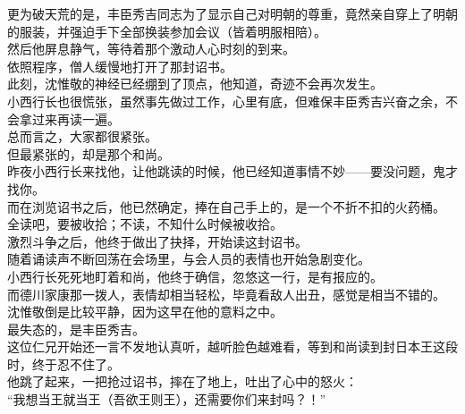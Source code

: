 \begin{multicols}{\theparacolNo}
更为破天荒的是，丰臣秀吉同志为了显示自己对明朝的尊重，竟然亲自穿上了明朝的服装，并强迫手下全部换装参加会议（皆着明服相陪）。\\

然后他屏息静气，等待着那个激动人心时刻的到来。\\

依照程序，僧人缓慢地打开了那封诏书。\\

此刻，沈惟敬的神经已经绷到了顶点，他知道，奇迹不会再次发生。\\

小西行长也很慌张，虽然事先做过工作，心里有底，但难保丰臣秀吉兴奋之余，不会拿过来再读一遍。\\

总而言之，大家都很紧张。\\

但最紧张的，却是那个和尚。\\

昨夜小西行长来找他，让他跳读的时候，他已经知道事情不妙——要没问题，鬼才找你。\\

而在浏览诏书之后，他已然确定，捧在自己手上的，是一个不折不扣的火药桶。\\

全读吧，要被收拾；不读，不知什么时候被收拾。\\

激烈斗争之后，他终于做出了抉择，开始读这封诏书。\\

随着诵读声不断回荡在会场里，与会人员的表情也开始急剧变化。\\

小西行长死死地盯着和尚，他终于确信，忽悠这一行，是有报应的。\\

而德川家康那一拨人，表情却相当轻松，毕竟看敌人出丑，感觉是相当不错的。\\

沈惟敬倒是比较平静，因为这早在他的意料之中。\\

最失态的，是丰臣秀吉。\\

这位仁兄开始还一言不发地认真听，越听脸色越难看，等到和尚读到封日本王这段时，终于忍不住了。\\

他跳了起来，一把抢过诏书，摔在了地上，吐出了心中的怒火：\\

“我想当王就当王（吾欲王则王），还需要你们来封吗？！”\\


\end{multicols}
